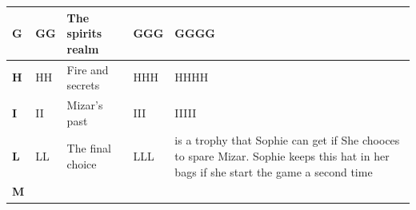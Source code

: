 \begin{longtable}[H]{|p{2cm}|p{1.5cm}|p{2cm}|p{2.8cm}|p{6.3cm}|}
\textbf{G}                           & GG                                                            & The spirits realm                                                                  & GGG                                                                                  & GGGG                                                                                                                                  \\ \hline
\textbf{H}                           & HH                                                            & Fire and secrets                                                                   & HHH                                                                                  & HHHH                                                                                                                                  \\ \hline
\textbf{I}                           & II                                                            & Mizar's past                                                                       & III                                                                                  & IIIII                                                                                                                                 \\ \hline
\textbf{L}                           & LL                                                            & The final choice                                                                   & LLL                                                                                  & is a trophy that Sophie can get if She chooces to spare Mizar. Sophie keeps this hat in her bags if she start the game a second time  \\ \hline
\textbf{M}         
  \end{longtable}
